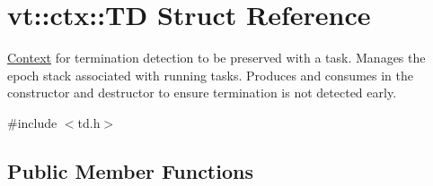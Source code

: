 \hypertarget{structvt_1_1ctx_1_1_t_d}{}\section{vt\+:\+:ctx\+:\+:TD Struct Reference}
\label{structvt_1_1ctx_1_1_t_d}


\hyperlink{structvt_1_1ctx_1_1_context}{Context} for termination detection to be preserved with a task. Manages the epoch stack associated with running tasks. Produces and consumes in the constructor and destructor to ensure termination is not detected early.  




{\ttfamily \#include $<$td.\+h$>$}

\subsection*{Public Member Functions}
